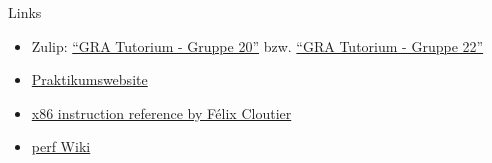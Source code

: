 \documentclass[
  german,            %
  aspectratio=169,    %
]{tumbeamer}
\begin{document}
\begin{frame}[fragile, c]{Links}{}
  \begin{itemize}
    \item Zulip: \href{https://zulip.in.tum.de/#narrow/stream/2267-GRA-Tutorium---Gruppe-20}{\enquote{GRA Tutorium - Gruppe 20}}
          bzw. \href{https://zulip.in.tum.de/#narrow/stream/2269-GRA-Tutorium---Gruppe-22}{\enquote{GRA Tutorium - Gruppe 22}}
    \item \href{https://gra.caps.in.tum.de}{Praktikumswebsite}
    \item \href{https://www.felixcloutier.com/x86/}{x86 instruction reference by Félix Cloutier}
    \item \href{https://perf.wiki.kernel.org/}{perf Wiki}
  \end{itemize}
\end{frame}

\maketitle
\end{document}
